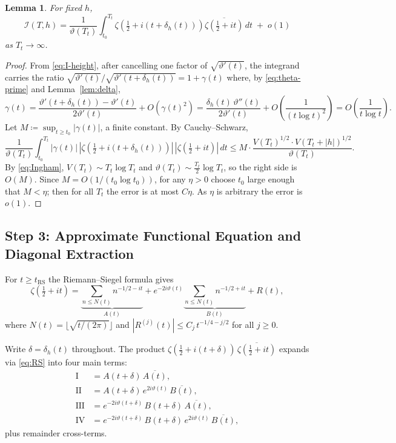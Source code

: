 \documentclass{amsart}
\newtheorem{lemma}[theorem]{Lemma}
\newcommand{\assign}{\coloneqq}
\begin{document}
\begin{lemma}\label{lem:jacobian}
For fixed $h$,
\[
  \mathcal{I}(T,h)
  = \frac{1}{\vartheta(T_t)}\int_{t_0}^{T_t}
    \zeta\!\left(\tfrac{1}{2}+i(t+\delta_h(t))\right)
    \overline{\zeta\!\left(\tfrac{1}{2}+it\right)}\,dt
  \;+\; o(1)
\]
as $T_t\to\infty$.
\end{lemma}
\begin{proof}
From \eqref{eq:I-height}, after cancelling one factor of $\sqrt{\vartheta'(t)}$,
the integrand carries the ratio $\sqrt{\vartheta'(t)}/\sqrt{\vartheta'(t+\delta_h(t))}
= 1 + \gamma(t)$ where, by \eqref{eq:theta-prime} and Lemma~\ref{lem:delta},
\[
  \gamma(t) = \frac{\vartheta'(t+\delta_h(t))-\vartheta'(t)}{2\vartheta'(t)}
             + O(\gamma(t)^2)
  = \frac{\delta_h(t)\,\vartheta''(t)}{2\vartheta'(t)} + O\!\left(\frac{1}{(t\log t)^2}\right)
  = O\!\left(\frac{1}{t\log t}\right).
\]
Let $M \assign \sup_{t\ge t_0}|\gamma(t)|$, a finite constant. By Cauchy--Schwarz,
\[
  \frac{1}{\vartheta(T_t)}\int_{t_0}^{T_t} |\gamma(t)|\,
  |\zeta(\tfrac{1}{2}+i(t+\delta_h(t)))|\,|\zeta(\tfrac{1}{2}+it)|\,dt
  \le M\cdot\frac{V(T_t)^{1/2}\cdot V(T_t+|h|)^{1/2}}{\vartheta(T_t)}.
\]
By \eqref{eq:Ingham}, $V(T_t) \sim T_t\log T_t$ and $\vartheta(T_t) \sim
\tfrac{T_t}{2}\log T_t$, so the right side is $O(M)$. Since $M = O(1/(t_0\log t_0))$,
for any $\eta > 0$ choose $t_0$ large enough that $M < \eta$; then for all $T_t$
the error is at most $C\eta$. As $\eta$ is arbitrary the error is $o(1)$.
\end{proof}

\subsection*{Step 3: Approximate Functional Equation and Diagonal Extraction}

For $t \ge t_{\mathrm{RS}}$ the Riemann--Siegel formula \cite{Titchmarsh1986} gives
\begin{equation}\label{eq:RS}
  \zeta\!\left(\tfrac{1}{2}+it\right)
  = \underbrace{\sum_{n\le N(t)} n^{-1/2-it}}_{A(t)}
  + e^{-2i\vartheta(t)}\underbrace{\sum_{n\le N(t)} n^{-1/2+it}}_{B(t)}
  + R(t),
\end{equation}
where $N(t) = \lfloor\sqrt{t/(2\pi)}\rfloor$ and $|R^{(j)}(t)| \le C_j\,t^{-1/4-j/2}$
for all $j\ge 0$.

Write $\delta = \delta_h(t)$ throughout. The product
$\zeta(\tfrac{1}{2}+i(t+\delta))\,\overline{\zeta(\tfrac{1}{2}+it)}$ expands
via \eqref{eq:RS} into four main terms:
\begin{align*}
  \mathrm{I}   &= A(t+\delta)\,\overline{A(t)}, \\
  \mathrm{II}  &= A(t+\delta)\,e^{2i\vartheta(t)}\,\overline{B(t)}, \\
  \mathrm{III} &= e^{-2i\vartheta(t+\delta)}\,B(t+\delta)\,\overline{A(t)}, \\
  \mathrm{IV}  &= e^{-2i\vartheta(t+\delta)}\,B(t+\delta)\,e^{2i\vartheta(t)}\,\overline{B(t)},
\end{align*}
plus remainder cross-terms.
\end{document}
